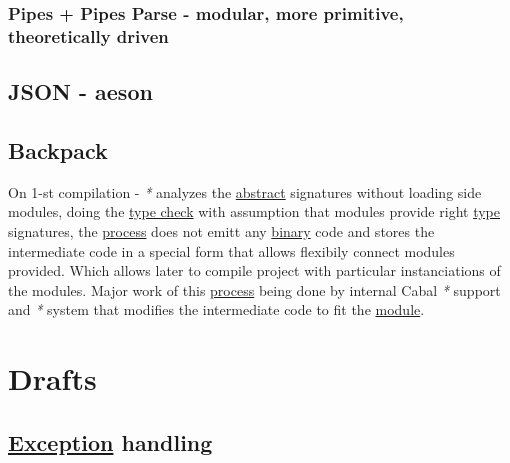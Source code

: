 \documentclass[a4paper,14pt,oneside]{book}
\begin{document}
{\section{Pipes + Pipes Parse - modular, more primitive, theoretically driven}
\label{sec:org3c0537b}

\chapter{JSON - aeson}
\label{sec:org941a954}

\chapter{\label{org633854e}Backpack}
\label{sec:orga6a5447}
On 1-st compilation - \emph{*} analyzes the \hyperref[org3affb7d]{abstract} signatures without loading side modules, doing the \hyperref[org315960d]{type check} with assumption that modules provide right \hyperref[orga9ca243]{type} signatures, the \hyperref[orgada3bb8]{process} does not emitt any \hyperref[orge428263]{binary} code and stores the intermediate code in a special form that allows flexibily connect modules provided. Which allows later to compile project with particular instanciations of the modules. Major work of this \hyperref[orgada3bb8]{process} being done by internal Cabal \emph{*} support and \emph{*} system that modifies the intermediate code to fit the \hyperref[org240ade3]{module}.\\

\part{Drafts}
\label{sec:orgd83ff04}

\chapter{\hyperref[org617291e]{Exception} handling}
\label{sec:org19db293}

}
\end{document}
